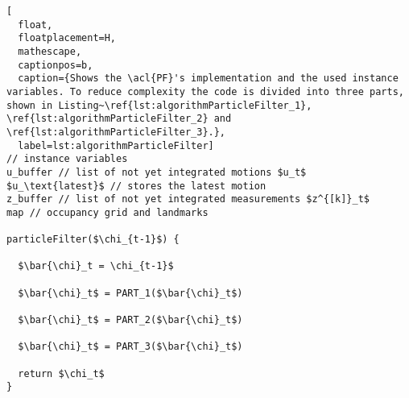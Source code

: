 \begin{lstlisting}[
  float,
  floatplacement=H,
  mathescape,
  captionpos=b,
  caption={Shows the \acl{PF}'s implementation and the used instance variables. To reduce complexity the code is divided into three parts, shown in Listing~\ref{lst:algorithmParticleFilter_1}, \ref{lst:algorithmParticleFilter_2} and \ref{lst:algorithmParticleFilter_3}.},
  label=lst:algorithmParticleFilter]
// instance variables
u_buffer // list of not yet integrated motions $u_t$
$u_\text{latest}$ // stores the latest motion
z_buffer // list of not yet integrated measurements $z^{[k]}_t$
map // occupancy grid and landmarks

particleFilter($\chi_{t-1}$) {

  $\bar{\chi}_t = \chi_{t-1}$

  $\bar{\chi}_t$ = PART_1($\bar{\chi}_t$)

  $\bar{\chi}_t$ = PART_2($\bar{\chi}_t$)

  $\bar{\chi}_t$ = PART_3($\bar{\chi}_t$)

  return $\chi_t$
}
\end{lstlisting}
